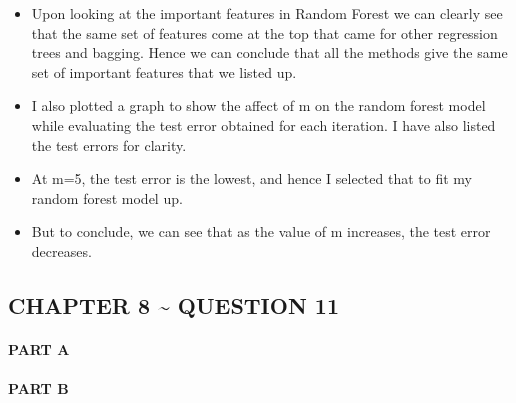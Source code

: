 \documentclass[
]{article}
\newenvironment{Shaded}{}{}
\newcommand{\DecValTok}[1]{#1}
\newcommand{\FunctionTok}[1]{#1}
\newcommand{\NormalTok}[1]{#1}
\newcommand{\OtherTok}[1]{\textcolor[rgb]{1.00,0.25,0.00}{#1}}
\newcommand{\SpecialCharTok}[1]{\textcolor[rgb]{0.00,0.50,0.50}{#1}}
\newcommand{\StringTok}[1]{\textcolor[rgb]{0.00,0.50,0.50}{#1}}
\begin{document}
\begin{itemize}
\item
  Upon looking at the important features in Random Forest we can clearly
  see that the same set of features come at the top that came for other
  regression trees and bagging. Hence we can conclude that all the
  methods give the same set of important features that we listed up.
\item
  I also plotted a graph to show the affect of m on the random forest
  model while evaluating the test error obtained for each iteration. I
  have also listed the test errors for clarity.
\item
  At m=5, the test error is the lowest, and hence I selected that to fit
  my random forest model up.
\item
  But to conclude, we can see that as the value of m increases, the test
  error decreases.
\end{itemize}

\hypertarget{chapter-8-question-11}{%
\subsection{CHAPTER 8 \textasciitilde{} QUESTION
11}\label{chapter-8-question-11}}

\hypertarget{part-a-5}{%
\paragraph{\texorpdfstring{{PART A}}{PART A}}\label{part-a-5}}

\begin{Shaded}
\end{Shaded}

\hypertarget{part-b-5}{%
\paragraph{\texorpdfstring{{PART B}}{PART B}}\label{part-b-5}}
\end{document}
